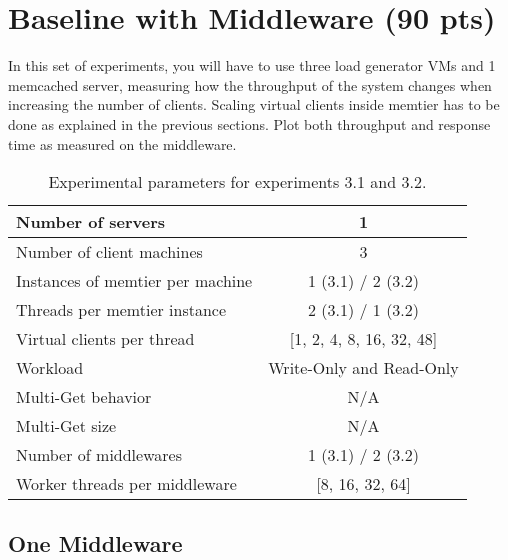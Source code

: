 \section{Baseline with Middleware (90 pts)\label{sec:3}}

    In this set of experiments, you will have to use three load generator VMs and 1 memcached server, measuring how the throughput of the system changes when increasing the number of clients. Scaling virtual clients inside memtier has to be done as explained in the previous sections. Plot both throughput and response time as measured on the middleware.

    \begin{table}
        \scriptsize{
            \begin{tabular}{|l|c|}
                \hline Number of servers                & 1 \\
                \hline Number of client machines        & 3 \\
                \hline Instances of memtier per machine & 1 (3.1) / 2 (3.2) \\
                \hline Threads per memtier instance     & 2 (3.1) / 1 (3.2) \\
                \hline Virtual clients per thread       & [1, 2, 4, 8, 16, 32, 48] \\
                \hline Workload                         & Write-Only and Read-Only \\
                \hline Multi-Get behavior               & N/A \\
                \hline Multi-Get size                   & N/A \\
                \hline Number of middlewares            & 1 (3.1) / 2 (3.2) \\
                \hline Worker threads per middleware    & [8, 16, 32, 64]  \\
                \hline
            \end{tabular}
        }
            \caption{Experimental parameters for experiments 3.1 and 3.2.\label{tab:30_setup}}
    \end{table}

    \subsection{One Middleware\label{subsec:3_one-middleware}}


